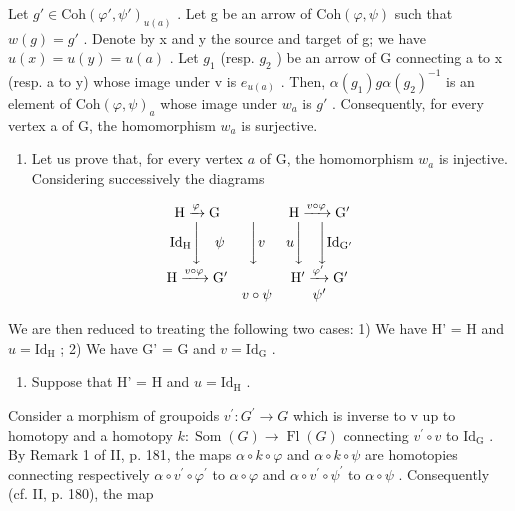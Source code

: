 Let \(g' \in \mathrm{Coh}(\varphi', \psi')_{u(a)}\) . Let g be an arrow of \(\mathrm{Coh}(\varphi, \psi)\) such that \(w(g) = g'\) . Denote by x and y the source and target of g; we have \(u(x) = u(y) = u(a)\) . Let \(g_1\) (resp. \(g_2\) ) be an arrow of G connecting a to x (resp. a to y) whose image under v is \(e_{u(a)}\) . Then, \(\alpha(g_1)g\alpha(g_2)^{-1}\) is an element of \(\mathrm{Coh}(\varphi, \psi)_a\) whose image under \(w_a\) is \(g'\) . Consequently, for every vertex a of G, the homomorphism \(w_a\) is surjective.

\begin{enumerate}
\def\labelenumi{\alph{enumi})}
\setcounter{enumi}{2}
\tightlist
\item
  Let us prove that, for every vertex \(a\) of G, the homomorphism \(w_{a}\) is injective. Considering successively the diagrams
\end{enumerate}

\[
\begin{array}{c c c} \mathrm{H} \xrightarrow {\varphi} \mathrm{G} & & \mathrm{H} \xrightarrow {v \circ \varphi} \mathrm{G} ^ {\prime} \\ \mathrm{Id} _ {\mathrm{H}} \Biggl \downarrow \quad \psi & \Biggl \downarrow v & u \Biggl \downarrow \quad \Biggl \downarrow \mathrm{Id} _ {\mathrm{G} ^ {\prime}} \\ \mathrm{H} \xrightarrow {v \circ \varphi} \mathrm{G} ^ {\prime} & & \mathrm{H} ^ {\prime} \xrightarrow {\varphi^ {\prime}} \mathrm{G} ^ {\prime} \\ & v \circ \psi & \psi^ {\prime} \end{array}
\]

We are then reduced to treating the following two cases: 1) We have H' = H and \(u = \mathrm{Id}_{\mathrm{H}}\) ; 2) We have G' = G and \(v = \mathrm{Id}_{\mathrm{G}}\) .

\begin{enumerate}
\def\labelenumi{\arabic{enumi})}
\tightlist
\item
  Suppose that H' = H and \(u = \mathrm{Id}_{\mathrm{H}}\) .
\end{enumerate}

Consider a morphism of groupoids \(v^{\prime}: G^{\prime} \to G\) which is inverse to v up to homotopy and a homotopy \(k: \operatorname{Som}(G) \to \operatorname{Fl}(G)\) connecting \(v^{\prime} \circ v\) to \(\mathrm{Id}_{\mathrm{G}}\) . By Remark 1 of II, p. 181, the maps \(\alpha \circ k \circ \varphi\) and \(\alpha \circ k \circ \psi\) are homotopies connecting respectively \(\alpha \circ v^{\prime} \circ \varphi^{\prime}\) to \(\alpha \circ \varphi\) and \(\alpha\circ v^{\prime}\circ\psi^{\prime}\) to \(\alpha\circ\psi\) . Consequently (cf. II, p. 180), the map

